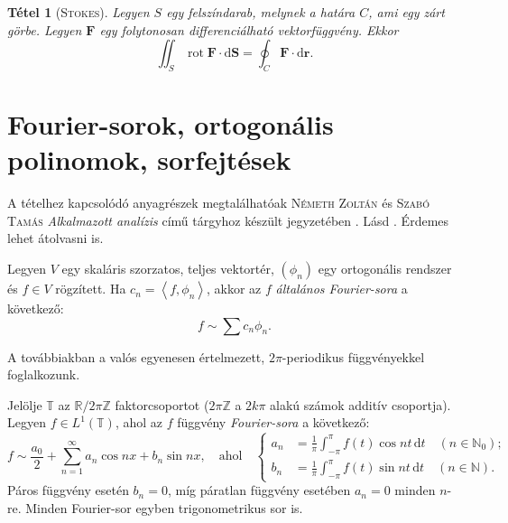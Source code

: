 \documentclass[DIV=15,appendixprefix]{scrreprt}
\newtheorem*{tetel}{Tétel}
\theoremstyle{definition}
\theoremstyle{remark}
\DeclareMathOperator{\rot}{rot}
\begin{document}
\begin{tetel}[\textsc{Stokes}]
	Legyen $ S $ egy felszíndarab, melynek a határa $ C $, ami egy zárt görbe. Legyen
	$ \mathbf{ F }$ egy folytonosan differenciálható vektorfüggvény. Ekkor
	\begin{equation*}
		\iint_{ S } \rot \mathbf{ F } \cdot \mathrm{ d } \mathbf{ S } = \oint_{ C } \mathbf{F} \cdot
		\mathrm{ d } \mathbf{r}.
	\end{equation*}
\end{tetel}
%
\section{Fourier-sorok, ortogonális polinomok, sorfejtések}
A tételhez kapcsolódó anyagrészek megtalálhatóak \textsc{Németh Zoltán} és \textsc{Szabó Tamás}
\emph{Alkalmazott analízis} című tárgyhoz készült jegyzetében \cite{SzTNZ}.
%
Lásd \cite[1.3. és 1.6.~szakaszok]{SzTNZ}. Érdemes lehet átolvasni \cite[1.4. és
1.5.~szakaszokat]{SzTNZ} is.

Legyen $ V $ egy skaláris szorzatos, teljes vektortér, $ \left( \phi_{ n } \right) $ egy
ortogonális rendszer és $ f \in V $ rögzített. Ha $ c_{ n } = \left\langle f,{} \phi_{ n }
\right\rangle $, akkor az $ f $ \emph{általános Fourier-sora} a következő:
\begin{equation*}
	f \sim \sum c_{ n } \phi_{ n }.
\end{equation*}

A továbbiakban a valós egyenesen értelmezett, $ 2 \pi $-periodikus függvényekkel foglalkozunk.

Jelölje $ \mathbb{ T } $ az $ \mathbb{R} / 2 \pi \mathbb{ Z } $ faktorcsoportot ($ 2 \pi
\mathbb{Z} $ a $ 2 k \pi $ alakú számok additív csoportja). Legyen $ f \in L^{ 1 } \left(
\mathbb{ T } \right) $, ahol  az $ f $ függvény \emph{Fourier-sora} a következő:
\begin{equation*}
	f \sim \frac{ a_{ 0 }}{ 2 } + \sum_{ n = 1 }^{ \infty } a_{ n } \cos n x + b_{ n } \sin n x,
	\quad \text{ahol} \quad \left\{ \begin{aligned}
		a_{ n } &= \frac{ 1 }{ \pi } \int_{ - \pi }^{ \pi } f \left( t \right) \cos n t \,
		\mathrm{ d }
		t \quad \left( n \in \mathbb{ N }_{ 0 } \right);\\
		b_{ n } &= \frac{ 1 }{ \pi } \int_{ - \pi }^{ \pi } f \left( t \right) \sin n t \,
		\mathrm{ d }
		t \quad \left( n \in \mathbb{ N }\right).
	\end{aligned} \right.
\end{equation*}
Páros függvény esetén $ b_{ n } = 0 $, míg páratlan függvény esetében $ a_{ n } = 0 $ minden
$ n $-re. Minden Fourier-sor egyben trigonometrikus sor is.
\end{document}
